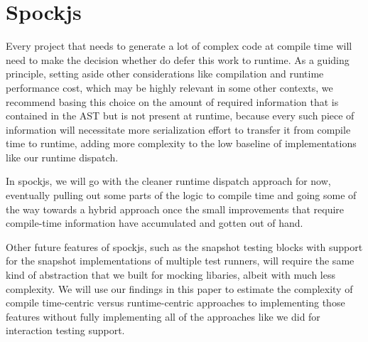 \section{Spockjs}
Every project that needs to
generate a lot of complex code at compile time
will need to make the decision
whether do defer this work to runtime.
As a guiding principle,
setting aside other considerations
like compilation and runtime performance cost,
which may be highly relevant in some other contexts,
we recommend basing this choice
on the amount of required information
that is contained in the AST
but is not present at runtime,
because every such piece of information
will necessitate more serialization effort
to transfer it from compile time to runtime,
adding more complexity to the low baseline
of implementations like our runtime dispatch.

In spockjs,
we will go with the cleaner runtime dispatch approach for now,
eventually pulling out some parts of the logic to compile time
and going some of the way towards a hybrid approach
once the small improvements that require compile-time information
have accumulated and gotten out of hand.

Other future features of spockjs,
such as the snapshot testing blocks
with support for the snapshot implementations of multiple test runners,
will require the same kind of abstraction
that we built for mocking libaries,
albeit with much less complexity.
We will use our findings in this paper
to estimate the complexity of
compile time-centric versus runtime-centric
approaches to implementing those features
without fully implementing all of the approaches
like we did for interaction testing support.
